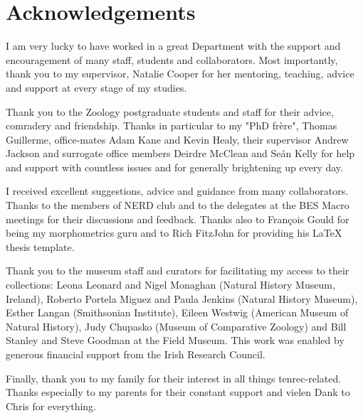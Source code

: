 
\chapter*{Acknowledgements}

I am very lucky to have worked in a great Department with the support and encouragement of many staff, students and collaborators. Most importantly, thank you to my supervisor, Natalie Cooper for her mentoring, teaching, advice and support at every stage of my studies. 

Thank you to the Zoology postgraduate students and staff for their advice, comradery and friendship. Thanks in particular to my "PhD fr\`{e}re", Thomas Guillerme, office-mates Adam Kane and Kevin Healy, their supervisor Andrew Jackson and surrogate office members Deirdre McClean and Se\'{a}n Kelly for help and support with countless issues and for generally brightening up every day.

I received excellent suggestions, advice and guidance from many collaborators. Thanks to the members of NERD club and to the delegates at the BES Macro meetings for their discussions and feedback. Thanks also to Fran\c{c}ois Gould for being my morphometrics guru and to Rich FitzJohn for providing his LaTeX thesis template. 

Thank you to the museum staff and curators for facilitating my access to their collections: Leona Leonard and Nigel Monaghan (Natural History Museum, Ireland), Roberto Portela Miguez and Paula Jenkins (Natural History Museum), Esther Langan (Smithsonian Institute), Eileen Westwig (American Museum of Natural History), Judy Chupasko (Museum of Comparative Zoology) and Bill Stanley and Steve Goodman at the Field Museum. This work was enabled by generous financial support from the Irish Research Council.

Finally, thank you to my family for their interest in all things tenrec-related. Thanks especially to my parents for their constant support and vielen Dank to Chris for everything. 